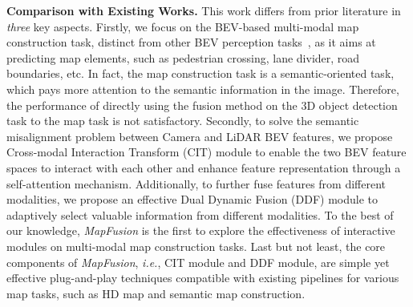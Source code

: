 \noindent\textbf{Comparison with Existing Works.}
This work differs from prior literature in \textit{three} key aspects. 
Firstly, we focus on the BEV-based multi-modal map construction task, distinct from other BEV perception tasks~\cite{chen2025stvit+,21cvprpointaug,21itscfusionpainting}, as it aims at predicting map elements, such as pedestrian crossing, lane divider, road boundaries, etc. 
In fact, the map construction task is a semantic-oriented task, which pays more attention to the semantic information in the image.
Therefore, the performance of directly using the fusion method on the 3D object detection task to the map task is not satisfactory.
Secondly, to solve the semantic misalignment problem between Camera and LiDAR BEV features, we propose Cross-modal Interaction Transform (CIT) module to enable the two BEV feature spaces to interact with each other and enhance feature representation through a self-attention mechanism.
Additionally, to further fuse features from different modalities, we propose an effective Dual Dynamic Fusion (DDF) module to adaptively select valuable information from different modalities.
To the best of our knowledge, \textit{MapFusion} is the first to explore the effectiveness of interactive modules on multi-modal map construction tasks.
Last but not least, the core components of \textit{MapFusion}, \textit{i.e.}, CIT module and DDF module, are simple yet effective plug-and-play techniques compatible with existing pipelines for various map tasks, such as HD map and semantic map construction.
